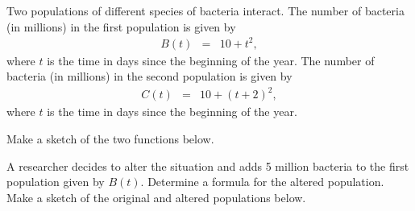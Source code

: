 
\begin{problem}
\item Two populations of different species of bacteria interact. The
  number of bacteria (in millions) in the first population is given by
  \begin{eqnarray*}
    B(t) & = & 10 + t^2,
  \end{eqnarray*}
  where $t$ is the time in days since the beginning of the year.  The
  number of bacteria (in millions) in the second population is given by
  \begin{eqnarray*}
    C(t) & = & 10+(t+2)^2,
  \end{eqnarray*}
  where $t$ is the time in days since the beginning of the year.
  \begin{subproblem}
  \item Make a sketch of the two functions below.
    \vfill
  \item A researcher decides to alter the situation and adds 5 million
    bacteria to the first population given by $B(t)$. Determine a
    formula for the altered population. Make a sketch of the original
    and altered populations below.
    \vfill
  \end{subproblem}

\end{problem}


